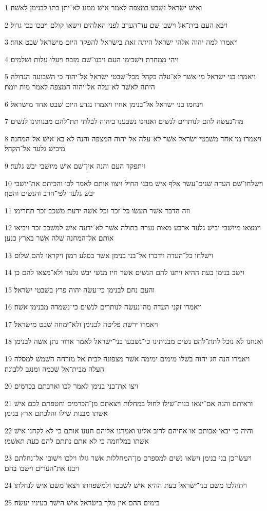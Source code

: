 \par 1 ואישׁ ישׂראל נשׁבע במצפה לאמר אישׁ ממנו לא־יתן בתו לבנימן לאשׁה׃
\par 2 ויבא העם בית־אל וישׁבו שׁם עד־הערב לפני האלהים וישׂאו קולם ויבכו בכי גדול׃
\par 3 ויאמרו למה יהוה אלהי ישׂראל היתה זאת בישׂראל להפקד היום מישׂראל שׁבט אחד׃
\par 4 ויהי ממחרת וישׁכימו העם ויבנו־שׁם מזבח ויעלו עלות ושׁלמים׃
\par 5 ויאמרו בני ישׂראל מי אשׁר לא־עלה בקהל מכל־שׁבטי ישׂראל אל־יהוה כי השׁבועה הגדולה היתה לאשׁר לא־עלה אל־יהוה המצפה לאמר מות יומת׃
\par 6 וינחמו בני ישׂראל אל־בנימן אחיו ויאמרו נגדע היום שׁבט אחד מישׂראל׃
\par 7 מה־נעשׂה להם לנותרים לנשׁים ואנחנו נשׁבענו ביהוה לבלתי תת־להם מבנותינו לנשׁים׃
\par 8 ויאמרו מי אחד משׁבטי ישׂראל אשׁר לא־עלה אל־יהוה המצפה והנה לא בא־אישׁ אל־המחנה מיבישׁ גלעד אל־הקהל׃
\par 9 ויתפקד העם והנה אין־שׁם אישׁ מיושׁבי יבשׁ גלעד׃
\par 10 וישׁלחו־שׁם העדה שׁנים־עשׂר אלף אישׁ מבני החיל ויצוו אותם לאמר לכו והכיתם את־יושׁבי יבשׁ גלעד לפי־חרב והנשׁים והטף׃
\par 11 וזה הדבר אשׁר תעשׂו כל־זכר וכל־אשׁה ידעת משׁכב־זכר תחרימו׃
\par 12 וימצאו מיושׁבי יבישׁ גלעד ארבע מאות נערה בתולה אשׁר לא־ידעה אישׁ למשׁכב זכר ויביאו אותם אל־המחנה שׁלה אשׁר בארץ כנען׃
\par 13 וישׁלחו כל־העדה וידברו אל־בני בנימן אשׁר בסלע רמון ויקראו להם שׁלום׃
\par 14 וישׁב בנימן בעת ההיא ויתנו להם הנשׁים אשׁר חיו מנשׁי יבשׁ גלעד ולא־מצאו להם כן׃
\par 15 והעם נחם לבנימן כי־עשׂה יהוה פרץ בשׁבטי ישׂראל׃
\par 16 ויאמרו זקני העדה מה־נעשׂה לנותרים לנשׁים כי־נשׁמדה מבנימן אשׁה׃
\par 17 ויאמרו ירשׁת פליטה לבנימן ולא־ימחה שׁבט מישׂראל׃
\par 18 ואנחנו לא נוכל לתת־להם נשׁים מבנותינו כי־נשׁבעו בני־ישׂראל לאמר ארור נתן אשׁה לבנימן׃
\par 19 ויאמרו הנה חג־יהוה בשׁלו מימים ימימה אשׁר מצפונה לבית־אל מזרחה השׁמשׁ למסלה העלה מבית־אל שׁכמה ומנגב ללבונה׃
\par 20 ויצו את־בני בנימן לאמר לכו וארבתם בכרמים׃
\par 21 וראיתם והנה אם־יצאו בנות־שׁילו לחול במחלות ויצאתם מן־הכרמים וחטפתם לכם אישׁ אשׁתו מבנות שׁילו והלכתם ארץ בנימן׃
\par 22 והיה כי־יבאו אבותם או אחיהם לרוב אלינו ואמרנו אליהם חנונו אותם כי לא לקחנו אישׁ אשׁתו במלחמה כי לא אתם נתתם להם כעת תאשׁמו׃
\par 23 ויעשׂו־כן בני בנימן וישׂאו נשׁים למספרם מן־המחללות אשׁר גזלו וילכו וישׁובו אל־נחלתם ויבנו את־הערים וישׁבו בהם׃
\par 24 ויתהלכו משׁם בני־ישׂראל בעת ההיא אישׁ לשׁבטו ולמשׁפחתו ויצאו משׁם אישׁ לנחלתו׃
\par 25 בימים ההם אין מלך בישׂראל אישׁ הישׁר בעיניו יעשׂה׃

